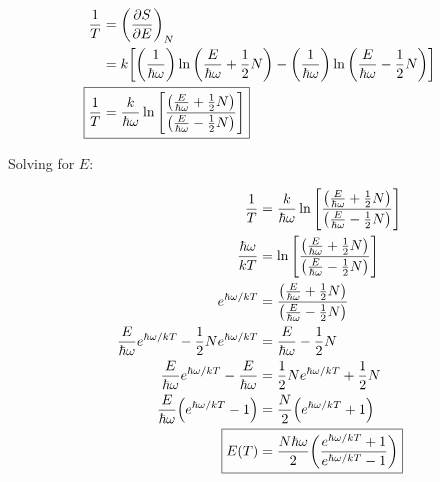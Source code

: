 \documentclass[12pt,a4paper]{article}
\begin{document}
\begin{align}
    \frac{1}{T} &= \qty(\pdv{S}{E})_{N} \\
    &= k\qty[\qty(\frac{1}{\hbar\omega})\ln\qty(\frac{E}{\hbar\omega} + \frac{1}{2}N) - \qty(\frac{1}{\hbar\omega})\ln\qty(\frac{E}{\hbar\omega} - \frac{1}{2}N)] \\
    \Aboxed{
    	\frac{1}{T} &= \frac{k}{\hbar\omega}\ln\qty[\frac{\qty(\frac{E}{\hbar\omega} + \frac{1}{2}N)}{\qty(\frac{E}{\hbar\omega} - \frac{1}{2}N)}]
    } \label{eq:answer-1}
\end{align}

Solving for $E$:

\begin{align}
    \frac{1}{T} &= \frac{k}{\hbar\omega}\ln\qty[\frac{\qty(\frac{E}{\hbar\omega} + \frac{1}{2}N)}{\qty(\frac{E}{\hbar\omega} - \frac{1}{2}N)}] \nonumber\\
    \frac{\hbar\omega}{kT} &= \ln\qty[\frac{\qty(\frac{E}{\hbar\omega} + \frac{1}{2}N)}{\qty(\frac{E}{\hbar\omega} - \frac{1}{2}N)}]\\
    e^{\hbar\omega/kT} &= \frac{\qty(\frac{E}{\hbar\omega} + \frac{1}{2}N)}{\qty(\frac{E}{\hbar\omega} - \frac{1}{2}N)}\\
    \frac{E}{\hbar\omega}e^{\hbar\omega/kT} - \frac{1}{2}Ne^{\hbar\omega/kT} &= \frac{E}{\hbar\omega} - \frac{1}{2}N\\
    \frac{E}{\hbar\omega}e^{\hbar\omega/kT} - \frac{E}{\hbar\omega} &= \frac{1}{2}Ne^{\hbar\omega/kT} + \frac{1}{2}N\\
    \frac{E}{\hbar\omega}\qty(e^{\hbar\omega/kT}-1) &= \frac{N}{2}\qty(e^{\hbar\omega/kT}+1)\\
    \Aboxed{
	    E(T) &= \frac{N\hbar\omega}{2}\qty(\frac{e^{\hbar\omega/kT}+1}{e^{\hbar\omega/kT}-1})
    }
\end{align}
\end{document}
